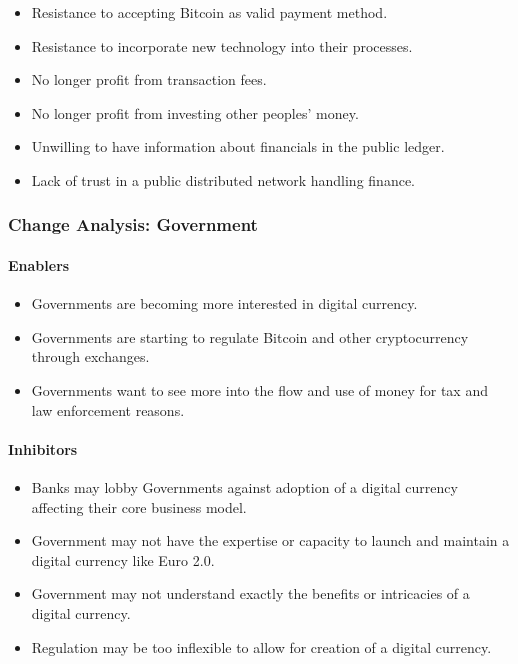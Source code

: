 \documentclass[a4paper,12pt]{article} %
\begin{document}
{\begin{itemize}
	\item Resistance to accepting Bitcoin as valid payment method.
	\item Resistance to incorporate new technology into their processes.
	\item No longer profit from transaction fees.
	\item No longer profit from investing other peoples' money.
	\item Unwilling to have information about financials in the public ledger.
	\item Lack of trust in a public distributed network handling finance.
\end{itemize}

\subsubsection{Change Analysis: Government} \label{sssec:4.5:government}

\paragraph*{Enablers}

\begin{itemize}
	\item Governments are becoming more interested in digital currency.
	\item Governments are starting to regulate Bitcoin and other cryptocurrency through exchanges.
	\item Governments want to see more into the flow and use of money for tax and law enforcement reasons.
\end{itemize}

\paragraph*{Inhibitors}

\begin{itemize}
	\item Banks may lobby Governments against adoption of a digital currency affecting their core business model.
	\item Government may not have the expertise or capacity to launch and maintain a digital currency like Euro 2.0.
	\item Government may not understand exactly the benefits or intricacies of a digital currency.
	\item Regulation may be too inflexible to allow for creation of a digital currency.
\end{itemize}

}
\end{document}
